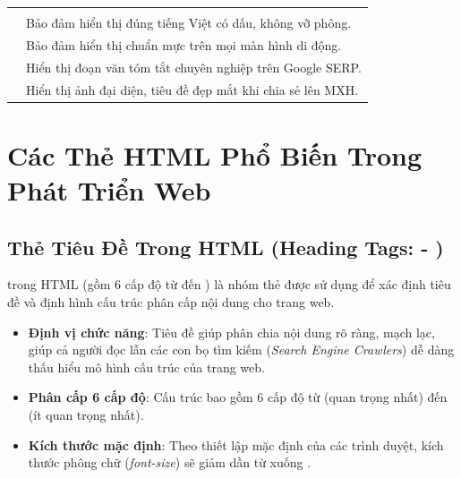 \begin{prettyTableBox}
\begin{tabularx}{\linewidth}{K{5.8cm} Z}
 &  \\
 & Bảo đảm hiển thị đúng tiếng Việt có dấu, không vỡ phông. \\
 & Bảo đảm hiển thị chuẩn mực trên mọi màn hình di động. \\
 & Hiển thị đoạn văn tóm tắt chuyên nghiệp trên Google SERP. \\
 & Hiển thị ảnh đại diện, tiêu đề đẹp mắt khi chia sẻ lên MXH. \\
\end{tabularx}
\end{prettyTableBox}

\section{Các Thẻ HTML Phổ Biến Trong Phát Triển Web}
\label{sec:common_html_tags}

\subsection{Thẻ Tiêu Đề Trong HTML (Heading Tags:  - )}
\label{subsec:heading_tags}

 trong HTML (gồm 6 cấp độ từ  đến ) là nhóm thẻ được sử dụng để xác định tiêu đề và định hình cấu trúc phân cấp nội dung cho trang web.

\begin{itemize}[leftmargin=1.8em, itemsep=4pt, parsep=0pt]
    \item \textbf{Định vị chức năng}: Tiêu đề giúp phân chia nội dung rõ ràng, mạch lạc, giúp cả người đọc lẫn các con bọ tìm kiếm (\textit{Search Engine Crawlers}) dễ dàng thấu hiểu mô hình cấu trúc của trang web.
    \item \textbf{Phân cấp 6 cấp độ}: Cấu trúc bao gồm 6 cấp độ từ  (quan trọng nhất) đến  (ít quan trọng nhất).
    \item \textbf{Kích thước mặc định}: Theo thiết lập mặc định của các trình duyệt, kích thước phông chữ (\textit{font-size}) sẽ giảm dần từ  xuống .
\end{itemize}

